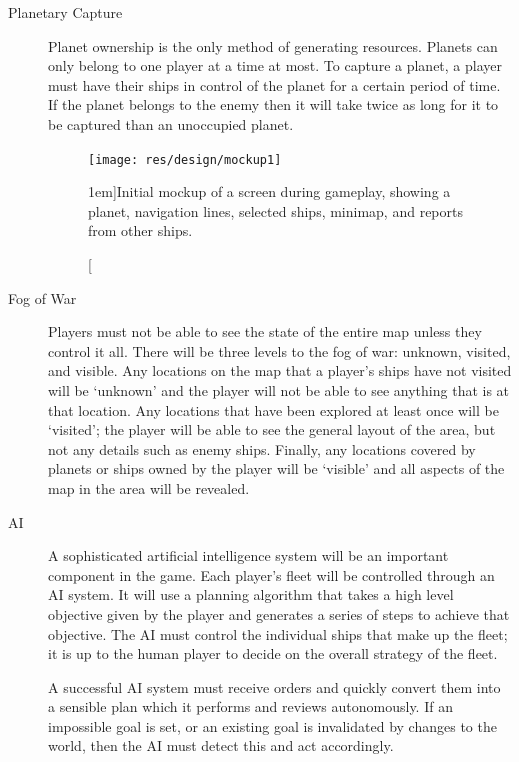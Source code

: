 \begin{description}
	\item[Planetary Capture] Planet ownership is the only method of generating resources. Planets can only belong to
	one player at a time at most. To capture a planet, a player must have their ships in control
	of the planet for a certain period of time. If the planet belongs to the enemy then it will
	take twice as long for it to be captured than an unoccupied planet.


\begin{figure}[t!]
	\texttt{[image: res/design/mockup1]}
	\caption[][1em]{Initial mockup of a screen during gameplay, showing a planet, navigation lines, selected ships, minimap, and reports from other ships.}
	\label{fig:mockup1}
\end{figure}

	\item[Fog of War] Players must not be able to see the state of the entire map unless they control it all. There
	will be three levels to the fog of war: unknown, visited, and visible. Any locations on the map
	that a player's ships have not visited will be `unknown' and the player will not be able to see
	anything that is at that location. Any locations that have been explored at least once will be
	`visited'; the player will be able to see the general layout of the area, but not any details
	such as enemy ships. Finally, any locations covered by planets or ships owned by the player will
	be `visible' and all aspects of the map in the area will be revealed.
	
	\item[AI] A sophisticated artificial intelligence system will be an important component in the game.
	Each player's fleet will be controlled through an AI system. It will use a planning algorithm
	that takes a high level objective given by the player and generates a series of steps to
	achieve that objective. The AI must control the individual ships that make up the fleet; it
	is up to the human player to decide on the overall strategy of the fleet.

	A successful AI system must receive orders and quickly convert them into a sensible plan which it performs and reviews autonomously. If an impossible goal is set, or an existing goal is
	invalidated by changes to the world, then the AI must detect this and act accordingly.



\end{description}
